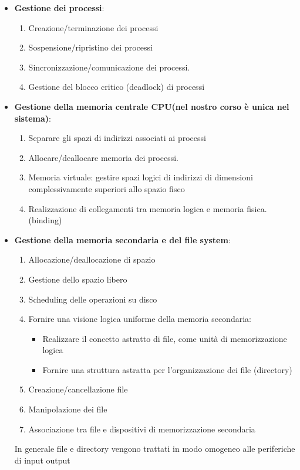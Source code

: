 \documentclass{article}
\begin{document}
\begin{itemize}
    \item \textbf{Gestione dei processi}: \begin{enumerate}
        \item Creazione/terminazione dei processi
        \item Sospensione/ripristino dei processi
        \item Sincronizzazione/comunicazione dei processi.
        \item Gestione del blocco critico (deadlock) di processi
        
    \end{enumerate}
    
    \item \textbf{Gestione della memoria centrale CPU(nel nostro corso è unica nel sistema)}: \begin{enumerate}
        \item Separare gli spazi di indirizzi associati ai processi
        \item Allocare/deallocare memoria dei processi.
        \item Memoria virtuale: gestire spazi logici di indirizzi di dimensioni complessivamente superiori allo spazio fisco
        \item Realizzazione di collegamenti tra memoria logica e memoria fisica.(binding)
    \end{enumerate}
    
    \item \textbf{Gestione della memoria secondaria e del file system}: \begin{enumerate}
        \item Allocazione/deallocazione di spazio
        \item Gestione dello spazio libero
        \item Scheduling delle operazioni su disco
        \item Fornire una visione logica uniforme della memoria secondaria: \begin{itemize}
            \item Realizzare il concetto astratto di file, come unità di memorizzazione logica
            \item Fornire una struttura astratta per l'organizzazione dei file (directory)
        \end{itemize}

        \item Creazione/cancellazione file
        \item Manipolazione dei file
        \item Associazione tra file e dispositivi di memorizzazione secondaria
    \end{enumerate}
    In generale file e directory vengono trattati in modo omogeneo alle periferiche di input output
        


\end{itemize}
\end{document}
